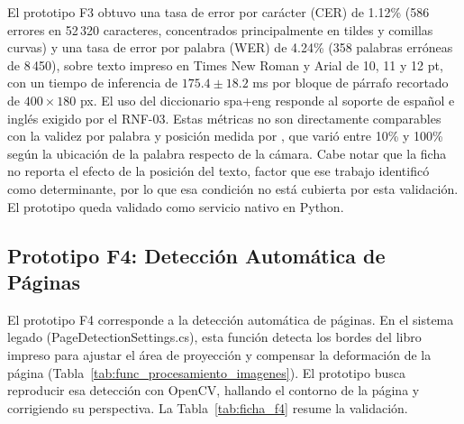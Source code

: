 El prototipo F3 obtuvo una tasa de error por carácter (CER) de 1.12\% (586 errores en 52\,320 caracteres, concentrados principalmente en tildes y comillas curvas) y una tasa de error por palabra (WER) de 4.24\% (358 palabras erróneas de 8\,450), sobre texto impreso en Times New Roman y Arial de 10, 11 y 12 pt, con un tiempo de inferencia de $175.4 \pm 18.2$ ms por bloque de párrafo recortado de $400 \times 180$ px. El uso del diccionario spa+eng responde al soporte de español e inglés exigido por el RNF-03. Estas métricas no son directamente comparables con la validez por palabra y posición medida por \cite{ibaceta2023evaluacion}, que varió entre 10\% y 100\% según la ubicación de la palabra respecto de la cámara. Cabe notar que la ficha no reporta el efecto de la posición del texto, factor que ese trabajo identificó como determinante, por lo que esa condición no está cubierta por esta validación. El prototipo queda validado como servicio nativo en Python.
 
\subsection{Prototipo F4: Detección Automática de Páginas}
 
El prototipo F4 corresponde a la detección automática de páginas. En el sistema legado (PageDetectionSettings.cs), esta función detecta los bordes del libro impreso para ajustar el área de proyección y compensar la deformación de la página (Tabla~\ref{tab:func_procesamiento_imagenes}). El prototipo busca reproducir esa detección con OpenCV, hallando el contorno de la página y corrigiendo su perspectiva. La Tabla~\ref{tab:ficha_f4} resume la validación.
 
